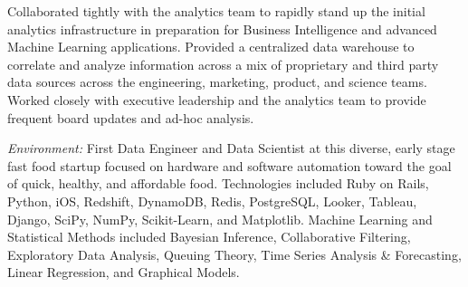\documentclass[10pt,a4paper]{article}
\begin{document}
{{{      \vspace{0.5em}
      Collaborated tightly with the analytics team to rapidly stand up the initial analytics infrastructure in preparation for Business Intelligence and advanced Machine Learning applications. Provided a centralized data warehouse to correlate and analyze information across a mix of proprietary and third party data sources across the engineering, marketing, product, and science teams. Worked closely with executive leadership and the analytics team to provide frequent board updates and ad-hoc analysis.

      \vspace{0.5em}
      \textit{Environment:} First Data Engineer and Data Scientist at this diverse, early stage fast food startup focused on hardware and software automation toward the goal of quick, healthy, and affordable food. Technologies included Ruby on Rails, Python, iOS, Redshift, DynamoDB, Redis, PostgreSQL, Looker, Tableau, Django, SciPy, NumPy, Scikit-Learn, and Matplotlib. Machine Learning and Statistical Methods included Bayesian Inference, Collaborative Filtering, Exploratory Data Analysis, Queuing Theory, Time Series Analysis \& Forecasting, Linear Regression, and Graphical Models.
    }}
}

\vspace{0.5em}
\end{document}
